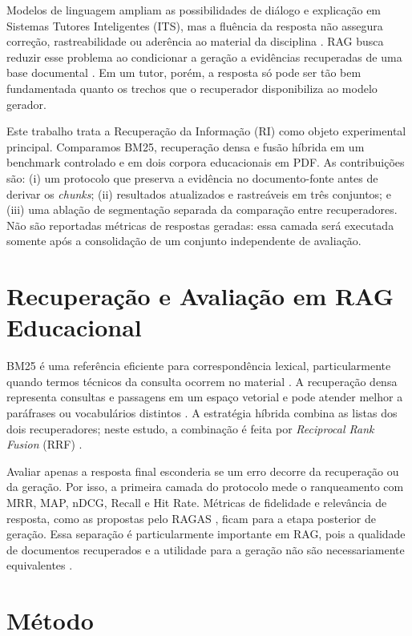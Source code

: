 \documentclass[12pt]{article}
\begin{document}
Modelos de linguagem ampliam as possibilidades de diálogo e explicação em
Sistemas Tutores Inteligentes (ITS), mas a fluência da resposta não assegura
correção, rastreabilidade ou aderência ao material da disciplina
\cite{woolf2009,kuhail2023}. RAG busca reduzir esse problema ao condicionar a
geração a evidências recuperadas de uma base documental \cite{lewis2020}. Em
um tutor, porém, a resposta só pode ser tão bem fundamentada quanto os trechos
que o recuperador disponibiliza ao modelo gerador.

Este trabalho trata a Recuperação da Informação (RI) como objeto experimental
principal. Comparamos BM25, recuperação densa e fusão híbrida em um benchmark
controlado e em dois corpora educacionais em PDF. As contribuições são: (i) um
protocolo que preserva a evidência no documento-fonte antes de derivar os
\textit{chunks}; (ii) resultados atualizados e rastreáveis em três conjuntos;
e (iii) uma ablação de segmentação separada da comparação entre recuperadores.
Não são reportadas métricas de respostas geradas: essa camada será executada
somente após a consolidação de um conjunto independente de avaliação.

\section{Recuperação e Avaliação em RAG Educacional}

BM25 é uma referência eficiente para correspondência lexical, particularmente
quando termos técnicos da consulta ocorrem no material \cite{manning2008,
robertson2009}. A recuperação densa representa consultas e passagens em um
espaço vetorial e pode atender melhor a paráfrases ou vocabulários distintos
\cite{karpukhin2020}. A estratégia híbrida combina as listas dos dois
recuperadores; neste estudo, a combinação é feita por \textit{Reciprocal Rank
Fusion} (RRF) \cite{cormack2009}.

Avaliar apenas a resposta final esconderia se um erro decorre da recuperação ou
da geração. Por isso, a primeira camada do protocolo mede o ranqueamento com
MRR, MAP, nDCG, Recall e Hit Rate. Métricas de fidelidade e relevância de
resposta, como as propostas pelo RAGAS \cite{ragas2023}, ficam para a etapa
posterior de geração. Essa separação é particularmente importante em RAG,
pois a qualidade de documentos recuperados e a utilidade para a geração não
são necessariamente equivalentes \cite{salemi2024}.

\section{Método}
\end{document}
